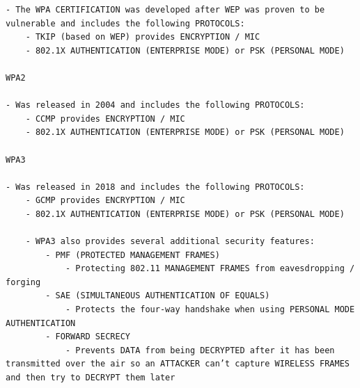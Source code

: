 \begin{lstlisting}
- The WPA CERTIFICATION was developed after WEP was proven to be vulnerable and includes the following PROTOCOLS:
    - TKIP (based on WEP) provides ENCRYPTION / MIC
    - 802.1X AUTHENTICATION (ENTERPRISE MODE) or PSK (PERSONAL MODE)

WPA2

- Was released in 2004 and includes the following PROTOCOLS:
    - CCMP provides ENCRYPTION / MIC
    - 802.1X AUTHENTICATION (ENTERPRISE MODE) or PSK (PERSONAL MODE)

WPA3

- Was released in 2018 and includes the following PROTOCOLS:
    - GCMP provides ENCRYPTION / MIC
    - 802.1X AUTHENTICATION (ENTERPRISE MODE) or PSK (PERSONAL MODE)

    - WPA3 also provides several additional security features:
        - PMF (PROTECTED MANAGEMENT FRAMES)
            - Protecting 802.11 MANAGEMENT FRAMES from eavesdropping / forging
        - SAE (SIMULTANEOUS AUTHENTICATION OF EQUALS)
            - Protects the four-way handshake when using PERSONAL MODE AUTHENTICATION
        - FORWARD SECRECY
            - Prevents DATA from being DECRYPTED after it has been transmitted over the air so an ATTACKER can’t capture WIRELESS FRAMES and then try to DECRYPT them later
\end{lstlisting}
